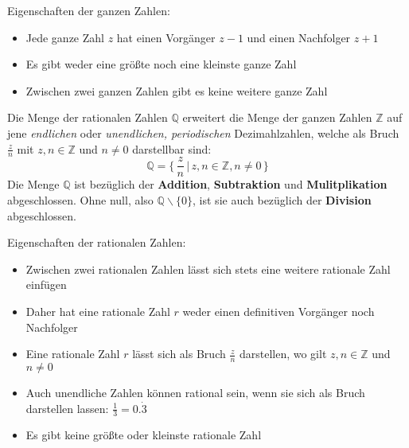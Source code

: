 Eigenschaften der ganzen Zahlen:

\begin{itemize}
	\item Jede ganze Zahl $z$ hat einen Vorg\"{a}nger $z - 1$ und einen Nachfolger $z + 1$
	\item Es gibt weder eine gr\"{o}\ss{}te noch eine kleinste ganze Zahl
	\item Zwischen zwei ganzen Zahlen gibt es keine weitere ganze Zahl
\end{itemize}

\pagebreak


Die Menge der rationalen Zahlen $\mathbb{Q}$ erweitert die Menge der ganzen Zahlen $\mathbb{Z}$ auf jene \emph{endlichen} oder \emph{unendlichen, periodischen} Dezimahlzahlen, welche als Bruch $\frac{z}{n}$ mit $z, n \in \mathbb{Z}$ und $n \neq 0$ darstellbar sind: $$\mathbb{Q} = \{\, \frac{z}{n} \,|\, z,n \in \mathbb{Z}, n \neq 0\,\}$$ Die Menge $\mathbb{Q}$ ist bez\"{u}glich der \textbf{Addition}, \textbf{Subtraktion} und \textbf{Mulitplikation} abgeschlossen. Ohne null, also $\mathbb{Q}\backslash\{0\}$, ist sie auch bez\"{u}glich der \textbf{Division} abgeschlossen.

\begin{figure}[h!]
\end{figure}
Eigenschaften der rationalen Zahlen:
\begin{itemize}
	\item Zwischen zwei rationalen Zahlen l\"{a}sst sich stets eine weitere rationale Zahl einf\"{u}gen
	\item Daher hat eine rationale Zahl $r$ weder einen definitiven Vorg\"{a}nger noch Nachfolger
	\item Eine rationale Zahl $r$ l\"{a}sst sich als Bruch $\frac{z}{n}$ darstellen, wo gilt $z, n \in \mathbb{Z}$ und $n \neq 0$
	\item Auch unendliche Zahlen k\"{o}nnen rational sein, wenn sie sich als Bruch darstellen lassen: $\frac{1}{3} = 0.\dot{3}$
	\item Es gibt keine gr\"{o}\ss{}te oder kleinste rationale Zahl
\end{itemize}

